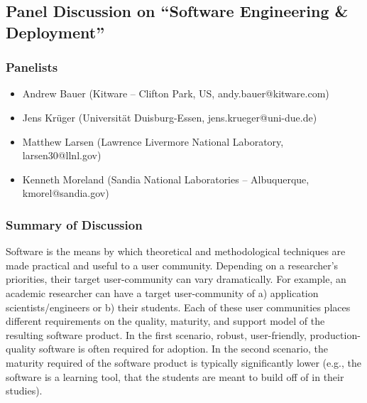 \subsection{Panel Discussion on ``Software Engineering \& Deployment''}

\subsubsection{Panelists}

\begin{itemize}
\item Andrew Bauer (Kitware -- Clifton Park, US, andy.bauer@kitware.com)
\item Jens Krüger  (Universität Duisburg-Essen, jens.krueger@uni-due.de)
\item Matthew Larsen (Lawrence Livermore National Laboratory, larsen30@llnl.gov)
\item Kenneth Moreland (Sandia National Laboratories -- Albuquerque, kmorel@sandia.gov)
\end{itemize}

%
%
%
%
%
%

\subsubsection{Summary of Discussion}

 Software is the means by which theoretical and methodological techniques are made practical and useful to a user community.  Depending on a researcher’s priorities, their target user-community can vary dramatically.  For example, an academic researcher can have a target user-community of a) application scientists/engineers or b) their students.  Each of these user communities places different requirements on the quality, maturity, and support model of the resulting software product.  In the first scenario, robust, user-friendly, production-quality software is often required for adoption.  In the second scenario, the maturity required of the software product is typically significantly lower (e.g., the software is a learning tool, that the students are meant to build off of in their studies).  

